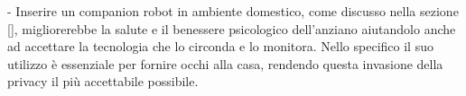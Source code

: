 \documentclass{thesisreport}
\begin{document}
- Inserire un companion robot in ambiente domestico, come discusso nella sezione [], migliorerebbe la salute e il benessere psicologico dell’anziano aiutandolo anche ad accettare la tecnologia che lo circonda e lo monitora.  Nello specifico il suo utilizzo è essenziale per fornire occhi alla casa, rendendo questa invasione della privacy il più accettabile possibile.

 
 
  
 
 
 
 
 
 
 
 
 
 
 
 
 
 

 
 
 
 
 
 
 
\end{document}
